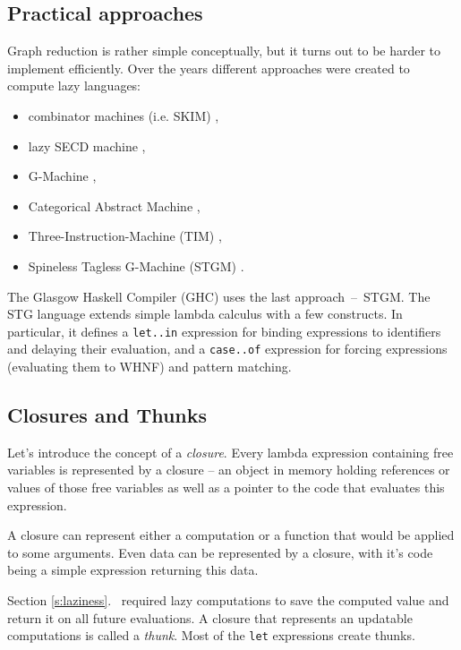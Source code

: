 \documentclass[en]{pracamgr}
\newcommand{\myref}[1]{\ref{#1}.~\nameref{#1}}
\begin{document}
\subsection{Practical approaches}

Graph reduction is rather simple conceptually, but it turns
out to be harder to implement efficiently. Over the
years different approaches were created to compute lazy languages: 

\begin{itemize}
    \item combinator machines (i.e. SKIM) \cite{combinators},
    \item lazy SECD machine \cite{SECDM},
    \item G-Machine \cite{G-Machine},
    \item Categorical Abstract Machine \cite{CAM},
    \item Three-Instruction-Machine (TIM) \cite{TIM},
    \item Spineless Tagless G-Machine (STGM) \cite{STGM}.
\end{itemize}

The Glasgow Haskell Compiler (GHC) uses the last approach~--~STGM.
The STG language extends simple lambda calculus with a few
constructs. In particular, it defines a \texttt{let..in} expression
for binding expressions to identifiers and delaying their evaluation,
and a \texttt{case..of} expression for forcing expressions (evaluating them to WHNF) and pattern matching.

\subsection{Closures and Thunks}\label{s:closures}

Let's introduce the concept of a \textit{closure}.
Every lambda expression containing free variables is represented by a closure --
an object in memory holding references or values of those free variables
as well as a pointer to the code that evaluates this expression.

A closure can represent either a computation or
a function that would be applied to some arguments.
Even data can be represented by a closure, with it's code
being a simple expression returning this data.

Section \myref{s:laziness} required lazy computations to
save the computed value and return it on all future
evaluations. A closure that represents an updatable
computations is called a \textit{thunk}.
Most of the \texttt{let} expressions create thunks. \\
\end{document}
